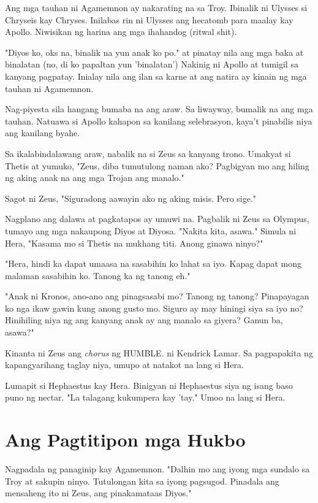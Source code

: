 \documentclass[12pt,letterpaper]{report}
\begin{document}
Ang mga tauhan ni Agamemnon ay nakarating na sa Troy. Ibinalik ni Ulysses si Chryseis kay Chryses.
Inilabas rin ni Ulysses ang hecatomb para maalay kay Apollo. Niwisikan ng harina ang mga ihahandog (ritwal shit).

"Diyos ko, oks na, binalik na yun anak ko po." at pinatay nila ang mga baka at binalatan
(no, di ko papaltan yun 'binalatan') Nakinig ni Apollo at tumigil sa kanyang pagpatay.
Inialay nila ang ilan sa karne at ang natira ay kinain ng mga tauhan ni Agamemnon.

Nag-piyesta sila hangang bumaba na ang araw. Sa liwayway, bumalik na ang mga tauhan.
Natuawa si Apollo kahapon sa kanilang selebrasyon, kaya't pinabilis niya ang kanilang byahe.

Sa ikalabindalawang araw, nabalik na si Zeus sa kanyang trono. Umakyat si Thetis at yumuko,
"Zeus, diba tumutulong naman ako? Pagbigyan mo ang hiling ng aking anak na ang mga Trojan ang manalo."

Sagot ni Zeus, "Siguradong aawayin ako ng aking misis. Pero sige."

Nagplano ang dalawa at pagkatapos ay umuwi na. Pagbalik ni Zeus sa Olympus, tumayo ang mga nakaupong Diyos at Diyosa.
"Nakita kita, asawa." Simula ni Hera, "Kasama mo si Thetis na mukhang titi. Anong ginawa ninyo?"

"Hera, hindi ka dapat umaasa na sasabihin ko lahat sa iyo. Kapag dapat mong malaman sasabihin ko.
Tanong ka ng tanong eh."

"Anak ni Kronos, ano-ano ang pinagsasabi mo? Tanong ng tanong?
Pinapayagan ko nga ikaw gawin kung anong gusto mo. Siguro ay may hiningi siya sa iyo no?
Hinihiling niya ng ang kanyang anak ay ang manalo sa giyera? Ganun ba, asawa?"

Kinanta ni Zeus ang \textit{chorus} ng HUMBLE. ni Kendrick Lamar. Sa pagpapakita ng kapangyarihang taglay niya,
umupo at natakot na lang si Hera.

Lumapit si Hephaestus kay Hera. Binigyan ni Hephaestus siya ng isang baso puno ng nectar.
"La talagang kukumpera kay 'tay." Umoo na lang si Hera.

\pagebreak
\chapter{Ang Pagtitipon mga Hukbo}

Nagpadala ng panaginip kay Agamemnon. "Dalhin mo ang iyong mga sundalo sa Troy at sakupin ninyo.
Tutulongan kita sa iyong pagsugod. Pinadala ang mensaheng ito ni Zeus, ang pinakamataas Diyos."
\end{document}

